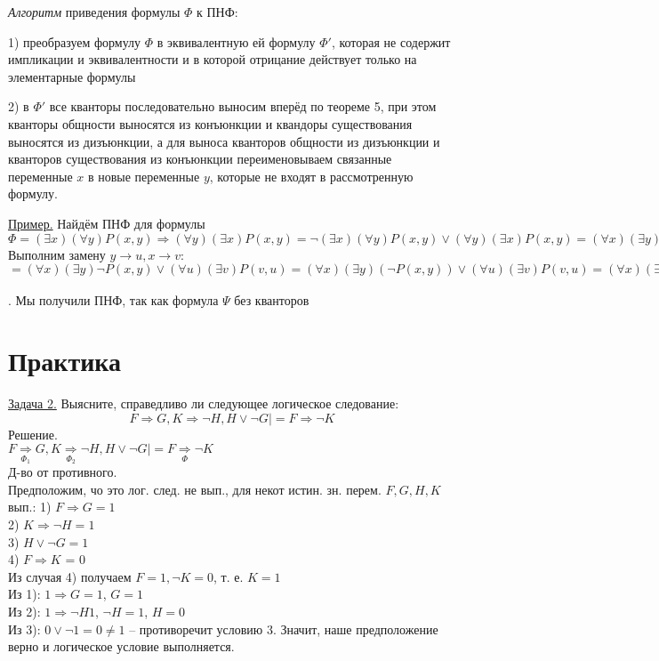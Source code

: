 \documentclass{SCWorks}
\begin{document}
\par {\it Алгоритм} приведения формулы $\Phi$ к ПНФ:
\par 1) преобразуем формулу $\Phi$ в эквивалентную ей формулу $\Phi'$, которая не содержит импликации и эквивалентности и в которой отрицание действует только на элементарные формулы
\par 2) в $\Phi'$ все кванторы последовательно выносим вперёд по теореме 5, при этом кванторы общности выносятся из конъюнкции и квандоры существования выносятся из дизъюнкции, а для выноса кванторов общности из дизъюнкции и кванторов существования из конъюнкции переименовываем связанные переменные $x$ в новые переменные $y$, которые не входят в рассмотренную формулу.
\par {\underline{Пример.}} Найдём ПНФ для формулы $\Phi = (\exists x)(\forall y)P(x, y) \Rightarrow (\forall y)(\exists x)P(x, y) = \neg(\exists x)(\forall y)P(x, y) \lor (\forall y)(\exists x)P(x, y) = (\forall x)(\exists y)\neg P(x, y) \lor (\forall y)(\exists x)P(x, y)$ \\
Выполним замену $y \rightarrow u, x \rightarrow v$: \\
$= (\forall x)(\exists y)\neg P(x, y)\lor(\forall u)(\exists v)P(v, u) = (\forall x)(\exists y)(\neg P(x, y))\lor(\forall u)(\exists v)P(v, u) = (\forall x)(\exists y)(\forall u)(\exists v)\underset{\Psi}{\underbrace{(\neg P(x,y) \lor P(v, u))}}$. Мы получили ПНФ, так как формула $\Psi$ без кванторов

\section{Практика}
\par \underline{Задача 2.}  Выясните, справедливо ли следующее логическое следование: 
\begin{equation*}
    F \Rightarrow G, K \Rightarrow \neg H, H \lor \neg G |= F \Rightarrow \neg K
\end{equation*}
Решение. \\
$F \underset{\Phi_1} \Rightarrow G, K \underset{\Phi_2} \Rightarrow \neg H, H \lor \neg G |= F \underset \Phi \Rightarrow \neg K$ \\
Д-во от противного. \\
Предположим, чо это лог. след. не вып., для некот истин. зн. перем. $F, G, H, K$ вып.:
1) $F \Rightarrow G = 1$ \\
2) $K \Rightarrow \neg H = 1$ \\
3) $H \lor \neg G = 1$ \\
4) $F \Rightarrow K$ = 0 \\
Из случая 4) получаем $F = 1, \neg K = 0$, т. е. $K = 1$ \\
Из 1): $1 \Rightarrow G = 1$, $G = 1$ \\
Из 2): $1 \Rightarrow \neg H 1$, $\neg H = 1$, $H = 0$ \\
Из 3): $0 \lor \neg 1 = 0 \neq 1$ -- противоречит условию 3. Значит, наше предположение верно и логическое условие выполняется.
\end{document}
